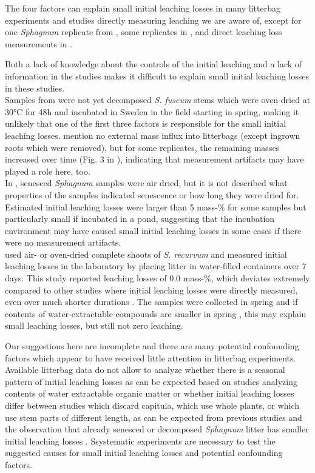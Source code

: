 \documentclass[bg, manuscript]{copernicus}
\begin{document}
The four factors can explain small initial leaching losses in many litterbag experiments and studies directly measuring leaching we are aware of, except for one \emph{Sphagnum} replicate from \citet{Breeuwer.2008}, some replicates in \citet{Moore.2007}, and direct leaching loss measurements in \citet{Coulson.1978}.

Both a lack of knowledge about the controls of the initial leaching and a lack of information in the studies makes it difficult to explain small initial leaching losses in these studies.\\
Samples from \citet{Breeuwer.2008} were not yet decomposed \emph{S. fuscum} stems which were oven-dried at 30°C for 48h and incubated in Sweden in the field starting in spring, making it unlikely that one of the first three factors is responsible for the small initial leaching losses. \citet{Breeuwer.2008} mention no external mass influx into litterbags (except ingrown roots which were removed), but for some replicates, the remaining masses increased over time (Fig. 3 in \citet{Breeuwer.2008}), indicating that measurement artifacts may have played a role here, too.\\
In \citet{Moore.2007}, senesced \emph{Sphagnum} samples were air dried, but it is not described what properties of the samples indicated senescence or how long they were dried for. Estimated initial leaching losses were larger than 5 mass-\% for some samples but particularly small if incubated in a pond, suggesting that the incubation environment may have caused small initial leaching losses in some cases if there were no measurement artifacts.\\
\citet{Coulson.1978} used air- or oven-dried complete shoots of \emph{S. recurvum} and measured initial leaching losses in the laboratory by placing litter in water-filled containers over 7 days. This study reported leaching losses of 0.0 mass-\%, which deviates extremely compared to other studies where initial leaching losses were directly measured, even over much shorter durations \citep{Moore.2001, Castells.2005, Mastny.2018}. The samples were collected in spring and if contents of water-extractable compounds are smaller in spring \citep{Sytiuk.2023}, this may explain small leaching losses, but still not zero leaching.

Our suggestions here are incomplete and there are many potential confounding factors which appear to have received little attention in litterbag experiments. Available litterbag data do not allow to analyze whether there is a seasonal pattern of initial leaching losses as can be expected based on studies analyzing contents of water extractable organic matter \citep{Edwards.2018, Sytiuk.2023} or whether initial leaching losses differ between studies which discard capitula, which use whole plants, or which use stem parts of different length, as can be expected from previous studies and the observation that already senesced or decomposed \emph{Sphagnum} litter has smaller initial leaching losses \citep{Moore.2001}. Ssystematic experiments are necessary to test the suggested causes for small initial leaching losses and potential confounding factors.
\end{document}
